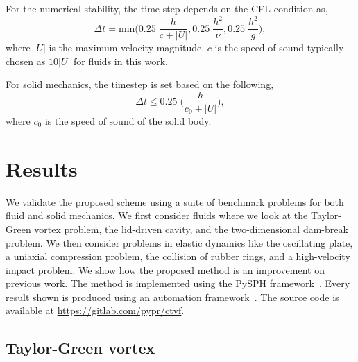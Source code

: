 For the numerical stability, the time step depends on the CFL condition as,
\begin{equation}
  \label{eq:time-step-cfl}
  \Delta t = \mathrm{min} \bigg( 0.25 \; \frac{h}{c + |U|} ,  0.25 \; \frac{h^2}{\nu},  0.25 \; \frac{h^2}{g} \bigg),
\end{equation}
where $|U|$ is the maximum velocity magnitude, $c$ is the speed of sound
typically chosen as $10 |U|$ for fluids in this work.

%
For solid mechanics, the timestep is set based on the following,
\begin{equation}
  \label{eq:time-step-body-force}
  \Delta t \leq 0.25 \; \bigg(\frac{h}{c_0 + |U|} \bigg),
\end{equation}
where $c_0$ is the speed of sound of the solid body.

\section{Results}
\label{sec:results}

We validate the proposed scheme using a suite of benchmark problems for both
fluid and solid mechanics. We first consider fluids where we look at the
Taylor-Green vortex problem, the lid-driven cavity, and the two-dimensional
dam-break problem. We then consider problems in elastic dynamics like the
oscillating plate, a uniaxial compression problem, the collision of rubber
rings, and a high-velocity impact problem. We show how the proposed method is an
improvement on previous work. The method is implemented using the PySPH
framework~\citep{PR:pysph:scipy16,pysph2020}. Every result shown is produced
using an automation framework~\citep{pr:automan:2018}. The source code is
available at \url{https://gitlab.com/pypr/ctvf}.

\FloatBarrier%

\subsection{Taylor-Green vortex}
\label{sec:tgv}


